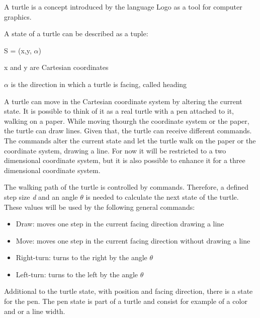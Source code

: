 \documentclass[english]{cpp-hmwk}
\begin{document}
\noindent A turtle is a concept introduced by the language Logo as a tool for computer graphics.\cite[Cf. Chapter 10, p.~179]{harvey1997computer}

\noindent A state of a turtle can be described as a tuple\cite[Cf. Chapter 1.3, p.~6ff]{prusinkiewiczp.lindenmayera.2004}:

\begin{center}
S = (x,y, $\alpha$)
\end{center}

x and y are Cartesian coordinates

$\alpha$ is the direction in which a turtle is facing, called heading

\medskip

\noindent A turtle can move in the Cartesian coordinate system by altering the current state. It is possible to think of it as a real turtle with a pen attached to it, walking on a paper. While moving thourgh the coordinate system or the paper, the turtle can draw lines. Given that, the turtle can receive different commands. The commands alter the current state and let the turtle walk on the paper or the coordinate system, drawing a line. For now it will be restricted to a two dimensional coordinate system, but it is also possible to enhance it for a three dimensional coordinate system.

\medskip

\noindent The walking path of the turtle is controlled by commands. Therefore, a defined step size \textit{d} and an angle \textit{$\theta$ } is needed to calculate the next state of the turtle. These values will be used by the following general commands: \cite[Cf. Chapter 2]{goldman2004turtle}

\begin{itemize}
\item Draw: moves one step in the current facing direction drawing a line 
\item Move: moves one step in the current facing direction without drawing a line
\item Right-turn: turns to the right by the angle $\theta$
\item Left-turn: turns to the left by the angle $\theta$
\end{itemize}

\noindent Additional to the turtle state, with position and facing direction, there is a state for the pen. The pen state is part of a turtle and consist for example of a color and or a line width.
\end{document}
